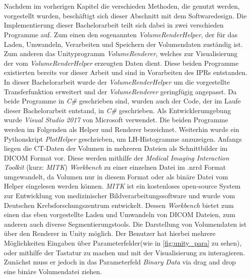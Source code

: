 \chapter{}
\label{sec:concept}


Nachdem im vorherigen Kapitel die verschieden Methoden, die genutzt werden, vorgestellt wurden, beschäftigt sich dieser Abschnitt mit dem Softwaredesign.
\newline
Die Implementierung dieser Bachelorarbeit teilt sich dabei in zwei verschieden Programme auf. Zum einen den sogenannten \textit{VolumeRenderHelper}, der für das Laden, Umwandeln, Verarbeiten und Speichern der Volumendaten zuständig ist.
Zum anderen das Unityprogramm \textit{VolumeRenderer}, welches zur Visualisierung der vom \textit{VolumeRenderHelper} erzeugten Daten dient. Diese beiden Programme existierten bereits vor dieser Arbeit und sind in Vorarbeiten des IPRs entstanden.
\newline
In dieser Bachelorarbeit wurde der \textit{VolumeRenderHelper} um die vorgestellte Transferfunktion erweitert und der \textit{VolumeRenderer} geringfügig angepasst. Da beide Programme in \textit{C\#} geschrieben sind, wurden auch der Code, der im Laufe dieser Bachelorarbeit entstand, in \textit{C\#} geschrieben. Als Entwicklerumgebung wurde \textit{Visual Studio 2017} von Microsoft verwendet. Die beiden Programme werden im Folgenden als Helper und Renderer bezeichnet. Weiterhin wurde ein Pythonskript \textit{PlotHelper} geschrieben, um LH-Histogramme anzuzeigen.
\newline
Anfangs liegen die CT-Daten der Volumen in mehreren Dateien als Schnittbilder im DICOM Format vor. Diese werden mithilfe der \textit{Medical Imaging Interaction Toolkit} (kurz: \textit{MITK}) \textit{Workbench} \cite{mitk} zu einer einzelnen Datei im .nrrd Format umgewandelt, da Volumen nur in diesem Format oder als binäre Datei vom Helper eingelesen werden können.
\textit{MITK} ist ein kostenloses open-source System zur Entwicklung von medizinischer Bildverarbeitungssoftware und wurde vom Deutschen Krebsforschungszentrum entwickelt. Dessen \textit{Workbench} bietet zum einen das eben vorgestellte Laden und Umwandeln von DICOM Dateien, zum anderen auch diverse Segmentierungstools.
\newline
Die Darstellung von Volumendaten ist über den Renderer in Unity möglich. Der Benutzer hat hierbei mehrere Möglichkeiten Eingaben über Parameterfelder(wie in \autoref{fig:unity_para} zu sehen), oder mithilfe der Tastatur zu machen und mit der Visualisierung zu interagieren. Zunächst muss er jedoch in das Parameterfeld \textit{Binary Data} via drag and drop eine binäre Volumendatei ziehen.
